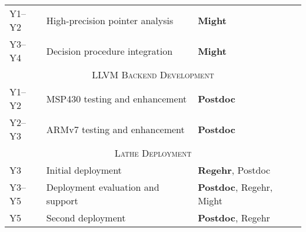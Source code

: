 \begin{center}
\begin{tabular}{l|l|l}
Y1--Y2 & High-precision pointer analysis & \textbf{Might}\\
Y3--Y4 & Decision procedure integration & \textbf{Might}\\
\hline
\multicolumn{3}{c}{\textsc{LLVM Backend Development}}\\ \hline
Y1--Y2 & MSP430 testing and enhancement & \textbf{Postdoc}\\
Y2--Y3 & ARMv7 testing and enhancement & \textbf{Postdoc}\\
\hline
\multicolumn{3}{c}{\textsc{Lathe Deployment}}\\ \hline
Y3 & Initial deployment & \textbf{Regehr}, Postdoc\\
Y3--Y5 & Deployment evaluation and support & \textbf{Postdoc}, Regehr, Might\\
Y5 & Second deployment & \textbf{Postdoc}, Regehr\\
\hline
\end{tabular}
\end{center}


